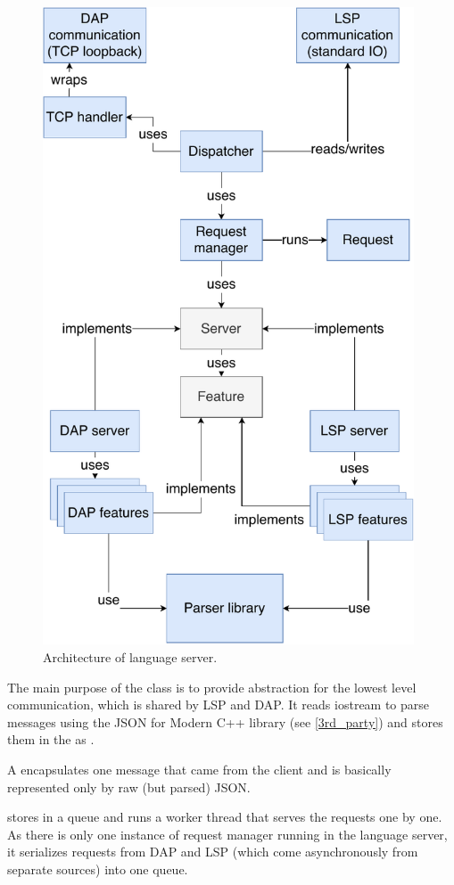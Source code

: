 \begin{figure}
	\centering
	\includegraphics[width=11cm]{img/lang_server}
	\caption{Architecture of language server.}
	\label{lang_server_arch}
\end{figure}


The main purpose of the class  is to provide abstraction for the lowest level communication, which is shared by LSP and DAP. It reads iostream to parse messages using the JSON for Modern C++ library (see \cref{3rd_party}) and stores them in the  as .

A  encapsulates one message that came from the client and is basically represented only by raw (but parsed) JSON.

 stores  in a queue and runs a worker thread that serves the requests one by one. As there is only one instance of request manager running in the language server, it serializes requests from DAP and LSP (which come asynchronously from separate sources) into one queue.

